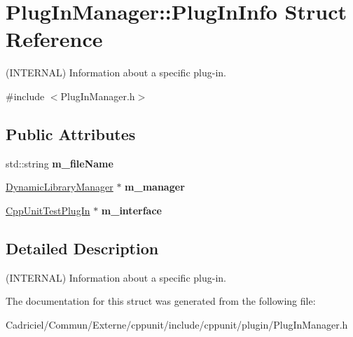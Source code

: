 \hypertarget{struct_plug_in_manager_1_1_plug_in_info}{}\section{Plug\+In\+Manager\+:\+:Plug\+In\+Info Struct Reference}
\label{struct_plug_in_manager_1_1_plug_in_info}


(I\+N\+T\+E\+R\+N\+AL) Information about a specific plug-\/in.  




{\ttfamily \#include $<$Plug\+In\+Manager.\+h$>$}

\subsection*{Public Attributes}
\begin{DoxyCompactItemize}
\item 
std\+::string {\bfseries m\+\_\+file\+Name}\hypertarget{struct_plug_in_manager_1_1_plug_in_info_ac084e2efe4d9953812eff03966c06988}{}\label{struct_plug_in_manager_1_1_plug_in_info_ac084e2efe4d9953812eff03966c06988}

\item 
\hyperlink{class_dynamic_library_manager}{Dynamic\+Library\+Manager} $\ast$ {\bfseries m\+\_\+manager}\hypertarget{struct_plug_in_manager_1_1_plug_in_info_a1889712db485e16a29c45ecba4780f0a}{}\label{struct_plug_in_manager_1_1_plug_in_info_a1889712db485e16a29c45ecba4780f0a}

\item 
\hyperlink{struct_cpp_unit_test_plug_in}{Cpp\+Unit\+Test\+Plug\+In} $\ast$ {\bfseries m\+\_\+interface}\hypertarget{struct_plug_in_manager_1_1_plug_in_info_a306eb58a5d6881b117d6bb9a9ae46589}{}\label{struct_plug_in_manager_1_1_plug_in_info_a306eb58a5d6881b117d6bb9a9ae46589}

\end{DoxyCompactItemize}


\subsection{Detailed Description}
(I\+N\+T\+E\+R\+N\+AL) Information about a specific plug-\/in. 

The documentation for this struct was generated from the following file\+:\begin{DoxyCompactItemize}
\item 
Cadriciel/\+Commun/\+Externe/cppunit/include/cppunit/plugin/Plug\+In\+Manager.\+h\end{DoxyCompactItemize}
